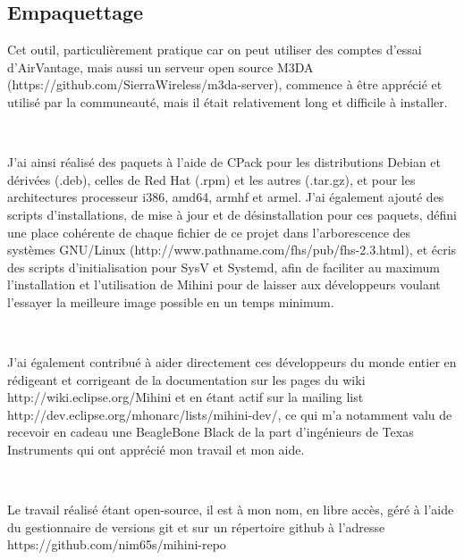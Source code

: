 \documentclass{article}
\begin{document}
\subsection{Empaquettage}
Cet outil, particulièrement pratique car on peut utiliser des comptes d’essai d’AirVantage, mais aussi un serveur open source M3DA (https://github.com/SierraWireless/m3da-server), commence à être apprécié et utilisé par la communeauté, mais il était relativement long et difficile à installer.

~

J’ai ainsi réalisé des paquets à l’aide de CPack pour les distributions Debian et dérivées (.deb), celles de Red Hat (.rpm) et les autres (.tar.gz), et pour les architectures processeur i386, amd64, armhf et armel. J’ai également ajouté des scripts d’installations, de mise à jour et de désinstallation pour ces paquets, défini une place cohérente de chaque fichier de ce projet dans l’arborescence des systèmes GNU/Linux (http://www.pathname.com/fhs/pub/fhs-2.3.html), et écris des scripts d’initialisation pour SysV et Systemd, afin de faciliter au maximum l’installation et l’utilisation de Mihini pour de laisser aux développeurs voulant l’essayer la meilleure image possible en un temps minimum.

~

J’ai également contribué à aider directement ces développeurs du monde entier en rédigeant et corrigeant de la documentation sur les pages du wiki http://wiki.eclipse.org/Mihini et en étant actif sur la mailing list http://dev.eclipse.org/mhonarc/lists/mihini-dev/, ce qui m’a notamment valu de recevoir en cadeau une BeagleBone Black de la part d’ingénieurs de Texas Instruments qui ont apprécié mon travail et mon aide.

~

Le travail réalisé étant open-source, il est à mon nom, en libre accès, géré à l’aide du gestionnaire de versions git et sur un répertoire github à l’adresse https://github.com/nim65s/mihini-repo
\end{document}
